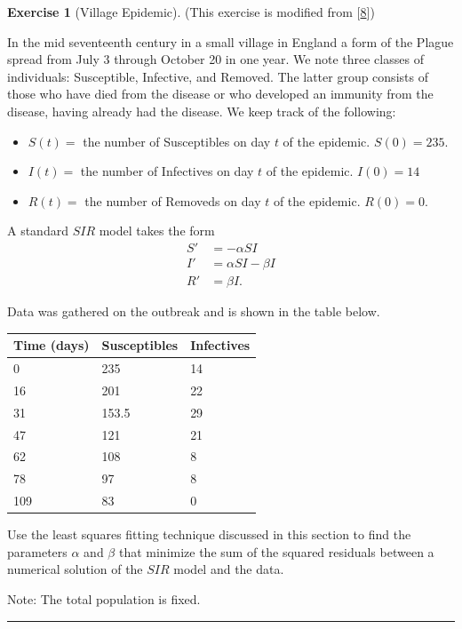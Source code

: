 \documentclass[
]{book}
\providecommand{\tightlist}{%
  \setlength{\itemsep}{0pt}\setlength{\parskip}{0pt}}
\theoremstyle{definition}
\theoremstyle{definition}
\theoremstyle{definition}
\newtheorem{exercise}{Exercise}[chapter]
\theoremstyle{remark}
\begin{document}
\begin{exercise}[Village Epidemic]
\protect\hypertarget{exr:unnamed-chunk-486}{}{\label{exr:unnamed-chunk-486} {} }(This exercise is modified from {[}\protect\hyperlink{ref-plague}{8}{]})

In the mid seventeenth century in a small village in England a form of the Plague spread from July 3 through October 20 in one year. We note three classes of individuals: Susceptible, Infective, and Removed. The latter group consists of those who have died from the disease or who developed an immunity from the disease, having already had the disease. We keep track of the following:

\begin{itemize}
\tightlist
\item
  \(S(t)=\) the number of Susceptibles on day \(t\) of the epidemic. \(S(0) = 235\).
\item
  \(I(t)=\) the number of Infectives on day \(t\) of the epidemic. \(I(0)=14\)
\item
  \(R(t)=\) the number of Removeds on day \(t\) of the epidemic. \(R(0)=0\).
\end{itemize}

A standard \(SIR\) model takes the form
\[\begin{aligned}  
S' &= -\alpha SI \\ 
I' &= \alpha SI - \beta I \\
R' &= \beta I.
\end{aligned}\]

Data was gathered on the outbreak and is shown in the table below.

\begin{longtable}[]{@{}lll@{}}
\toprule
Time (days) & Susceptibles & Infectives\tabularnewline
\midrule
\endhead
0 & 235 & 14\tabularnewline
16 & 201 & 22\tabularnewline
31 & 153.5 & 29\tabularnewline
47 & 121 & 21\tabularnewline
62 & 108 & 8\tabularnewline
78 & 97 & 8\tabularnewline
109 & 83 & 0\tabularnewline
\bottomrule
\end{longtable}

Use the least squares fitting technique discussed in this section to find the parameters \(\alpha\) and \(\beta\) that minimize the sum of the squared residuals between a numerical solution of the \(SIR\) model and the data.

Note: The total population is fixed.
\end{exercise}

\begin{center}\rule{0.5\linewidth}{0.5pt}\end{center}
\end{document}
